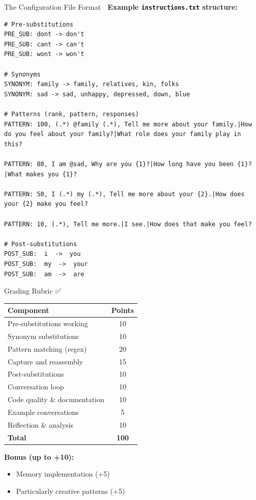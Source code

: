 \documentclass[aspectratio=169]{beamer}
\begin{document}
\begin{frame}[fragile]{The Configuration File Format 📄}
\textbf{Example \texttt{instructions.txt} structure:}

\begin{lstlisting}[basicstyle=\ttfamily\tiny]
# Pre-substitutions
PRE_SUB: dont -> don't
PRE_SUB: cant -> can't
PRE_SUB: wont -> won't

# Synonyms
SYNONYM: family -> family, relatives, kin, folks
SYNONYM: sad -> sad, unhappy, depressed, down, blue

# Patterns (rank, pattern, responses)
PATTERN: 100, (.*) @family (.*), Tell me more about your family.|How do you feel about your family?|What role does your family play in this?

PATTERN: 80, I am @sad, Why are you {1}?|How long have you been {1}?|What makes you {1}?

PATTERN: 50, I (.*) my (.*), Tell me more about your {2}.|How does your {2} make you feel?

PATTERN: 10, (.*), Tell me more.|I see.|How does that make you feel?

# Post-substitutions
POST_SUB:  i  ->  you
POST_SUB:  my  ->  your
POST_SUB:  am  ->  are
\end{lstlisting}
\end{frame}

\begin{frame}{Grading Rubric ✅}
\begin{center}
\begin{tabular}{lc}
\toprule
\textbf{Component} & \textbf{Points} \\
\midrule
Pre-substitutions working & 10 \\
Synonym substitutions & 10 \\
Pattern matching (regex) & 20 \\
Capture and reassembly & 15 \\
Post-substitutions & 10 \\
Conversation loop & 10 \\
Code quality \& documentation & 10 \\
Example conversations & 5 \\
Reflection \& analysis & 10 \\
\midrule
\textbf{Total} & \textbf{100} \\
\bottomrule
\end{tabular}
\end{center}

\vspace{0.3cm}

\textbf{Bonus (up to +10):}
\begin{itemize}\setlength{\itemsep}{0pt}
    \item Memory implementation (+5)
    \item Particularly creative patterns (+5)
\end{itemize}
\end{frame}
\end{document}
